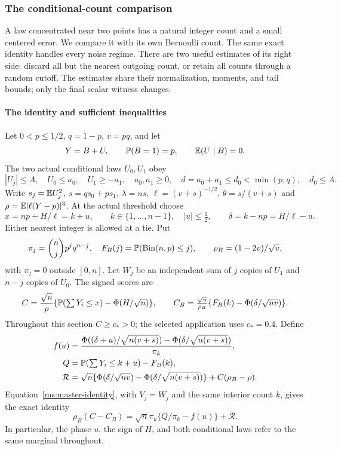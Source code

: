 \subsubsection{The conditional-count comparison}\label{ms:fourier:cut49:shortloc:section}

A law concentrated near two points has a natural integer count and a small
centered error. We compare it with its own Bernoulli count. The same exact
identity handles every noise regime. There are two useful estimates of its
right side: discard all but the nearest outgoing count, or retain all counts
through a random cutoff. The estimates share their normalization, moments,
and tail bounds; only the final scalar witness changes.

\paragraph{The identity and sufficient inequalities}

Let $0<p\le1/2$, $q=1-p$, $v=pq$, and let
\[
 Y=B+U,\qquad \mathbb P(B=1)=p,\qquad \mathbb E(U\mid B)=0.
\]
The two actual conditional laws $U_0,U_1$ obey
\begin{equation}\label{ms:fourier:cut49:shortloc:support}
 |U_j|\le A,\quad U_0\le a_0,\quad U_1\ge-a_1,\quad
 a_0,a_1\ge0,\quad d=a_0+a_1\le d_0<\min(p,q),\quad d_0\le A.
\end{equation}
Write $s_j=\mathbb E U_j^2$, $s=qs_0+ps_1$, $\lambda=ns$,
$\ell=(v+s)^{-1/2}$, $\theta=s/(v+s)$ and
$\rho=\mathbb E|\ell(Y-p)|^3$. At the actual threshold choose
\[
 x=np+H/\ell=k+u,\qquad k\in\{1,\ldots,n-1\},\quad |u|\le\tfrac12,
 \qquad \delta=k-np=H/\ell-u.
\]
Either nearest integer is allowed at a tie. Put
\[
 \pi_j=\binom njp^jq^{n-j},\quad F_B(j)=\mathbb P(\operatorname{Bin}(n,p)\le j),
 \qquad \rho_B=(1-2v)/\sqrt v,
\]
with $\pi_j=0$ outside $[0,n]$. Let $W_j$ be an independent sum of $j$
copies of $U_1$ and $n-j$ copies of $U_0$. The signed scores are
\[
 C=\frac{\sqrt n}{\rho}\{\mathbb P(\textstyle\sum Y_i\le x)-\Phi(H/\sqrt n)\},
 \qquad C_B=\frac{\sqrt n}{\rho_B}\{F_B(k)-\Phi(\delta/\sqrt{nv})\}.
\]
Throughout this section $C\ge c_*>0$; the selected application uses $c_*=0.4$.
Define
\begin{align}
 f(u)&=\frac{\Phi((\delta+u)/\sqrt{n(v+s)})-
                    \Phi(\delta/\sqrt{n(v+s)})}{\pi_k},\label{ms:fourier:cut49:shortloc:f}\\
 Q&=\mathbb P(\textstyle\sum Y_i\le k+u)-F_B(k),\nonumber\\
 \mathcal R&=\sqrt n\{\Phi(\delta/\sqrt{nv})-
                 \Phi(\delta/\sqrt{n(v+s)})\}+C(\rho_B-\rho).\nonumber
\end{align}
Equation~\eqref{ms:master-identity}, with $V_j=W_j$ and the same
interior count $k$, gives the exact identity
\begin{equation}\label{ms:fourier:cut49:shortloc:master}
 \rho_B(C-C_B)=\sqrt n\pi_k\{Q/\pi_k-f(u)\}+\mathcal R.
\end{equation}
In particular, the phase $u$, the sign of $H$, and both conditional laws
refer to the same marginal throughout.


